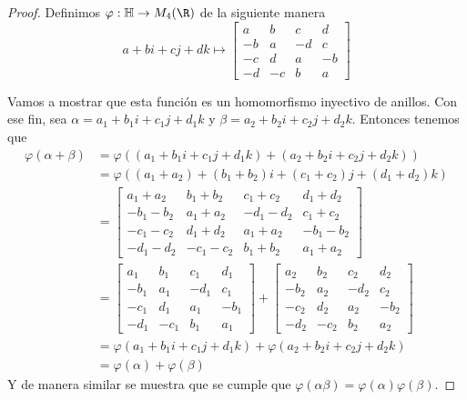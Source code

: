 \begin{problem}[14]
\end{problem}
\newcommand{\HH}{\mathbb{H}}
\begin{proof}
    Definimos $\varphi: \HH \to M_4(\R)$ de la siguiente manera
    $$
    a+bi+cj+dk \mapsto
    \begin{bmatrix}
        a & b & c & d \\
        -b & a & -d & c \\
        -c & d & a & -b \\
        -d & -c & b & a
    \end{bmatrix}
    $$
    
    Vamos a mostrar que esta función es un homomorfismo inyectivo de anillos. Con ese fin, sea $\alpha = a_1 + b_1 i + c_1 j + d_1 k$ y $\beta = a_2 + b_2 i + c_2 j + d_2 k$. Entonces tenemos que
    \begin{align*}
        \varphi(\alpha + \beta) &= \varphi((a_1 + b_1i + c_1j + d_1k)+(a_2 + b_2i + c_2j + d_2k)) \\
        &= \varphi((a_1 + a_2) + (b_1+b_2)i + (c_1+c_2)j + (d_1+d_2)k)\\  
        &=
        \begin{bmatrix}
            a_1+a_2 & b_1+b_2 & c_1+c_2 & d_1+d_2 \\
            -b_1-b_2 & a_1+a_2 & -d_1-d_2 & c_1+c_2 \\
            -c_1-c_2 & d_1+d_2 & a_1+a_2 & -b_1-b_2 \\
            -d_1-d_2 & -c_1-c_2 & b_1+b_2 & a_1+a_2 
        \end{bmatrix} \\
        &=
        \begin{bmatrix}
            a_1 & b_1 & c_1 & d_1 \\
            -b_1 & a_1 & -d_1 & c_1 \\
            -c_1 & d_1 & a_1 & -b_1 \\
            -d_1 & -c_1 & b_1 & a_1
        \end{bmatrix}+
        \begin{bmatrix}
            a_2 & b_2 & c_2 & d_2 \\
            -b_2 & a_2 & -d_2 & c_2 \\
            -c_2 & d_2 & a_2 & -b_2 \\
            -d_2 & -c_2 & b_2 & a_2
        \end{bmatrix} \\
        &= \varphi(a_1 + b_1i + c_1j + d_1k) + \varphi(a_2 + b_2i + c_2j + d_2k)\\
        &= \varphi(\alpha) + \varphi(\beta)
    \end{align*}
    Y de manera similar se muestra que se cumple que $\varphi(\alpha \beta) = \varphi(\alpha) \varphi(\beta)$.


\end{proof}
